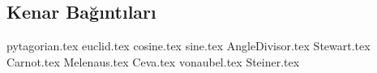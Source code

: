 \subsection{Kenar Bağıntıları}
{pytagorian.tex}
\newpage
{euclid.tex}
\newpage
{cosine.tex}
\newpage
{sine.tex}
\newpage
{AngleDivisor.tex}
\newpage
{Stewart.tex}
\newpage
{Carnot.tex}
\newpage
{Melenaus.tex}
\newpage
{Ceva.tex}
\newpage
{vonaubel.tex}
\newpage
{Steiner.tex}
\newpage
